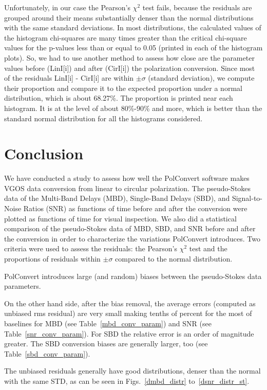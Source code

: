 \documentclass[letterpaper,twoside,12pt]{article}
\begin{document}
Unfortunately, in our case the Pearson's $\chi^2$ test fails, because the residuals are grouped around their means substantially denser than the normal distributions with the same standard deviations. In most distributions, the calculated values of the histogram chi-squares are many times greater than the critical chi-square values for the p-values less than or equal to 0.05 (printed in each of the histogram plots).
So, we had to use another method to assess how close are the parameter values before (LinI[i]) and after (CirI[i]) the polarization conversion. Since most of the residuals LinI[i] - CirI[i] are within $\pm \sigma$ (standard deviation), we  compute their proportion and compare it to the expected proportion under a normal distribution, which is about 68.27\%. The proportion is printed near each histogram. It is at the level of about 80\%-90\% and more, which is better than the standard normal distribution for all the histograms considered.




\section{Conclusion}

We have conducted a study to assess how well the PolConvert software makes VGOS data conversion from linear to circular polarization. The pseudo-Stokes data of the Multi-Band Delays (MBD), Single-Band Delays (SBD), and Signal-to-Noise Ratios (SNR) as functions of time before and after the conversion were plotted as functions of time for visual inspection. We also did a statistical comparison of the pseudo-Stokes data of MBD, SBD, and SNR before and after the conversion in order to characterize the variations PolConvert introduces. Two criteria were used to assess the residuals: the Pearson's $\chi^2$ test and the proportions of residuals within $\pm\sigma$ compared to the normal distribution. 

PolConvert introduces large (and random) biases between the pseudo-Stokes data parameters. 

On the other hand side, after the bias removal, the average errors (computed as unbiased rms residual) are very small making tenths of percent for the most of baselines for MBD (see Table~\ref{mbd_conv_param}) and SNR (see Table~\ref{snr_conv_param}). For SBD the relative error is an order of magnitude greater. The SBD conversion biases are generally larger, too (see Table~\ref{sbd_conv_param}).

The unbiased residuals generally have good distributions, denser than the normal with the same STD, as can be seen in Figs.~\ref{dmbd_distr} to~\ref{dsnr_distr_st}.
\end{document}
